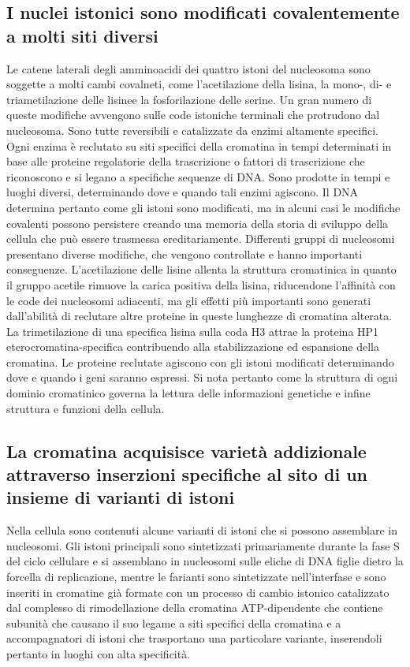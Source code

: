 \subsection{I nuclei istonici sono modificati covalentemente a molti siti diversi}
Le catene laterali degli amminoacidi dei quattro istoni del nucleosoma sono soggette a molti cambi covalneti, come l'acetilazione della lisina, la mono-, di- e triametilazione delle 
lisinee la fosforilazione delle serine. Un gran numero di queste modifiche avvengono sulle code istoniche  terminali che protrudono dal nucleosoma. Sono tutte reversibili e 
catalizzate da enzimi altamente specifici. Ogni enzima \`e reclutato su siti specifici della cromatina in tempi determinati in base alle proteine regolatorie della trascrizione o 
fattori di trascrizione che riconoscono e si legano a specifiche sequenze di DNA. Sono prodotte in tempi e luoghi diversi, determinando dove e quando tali enzimi agiscono. Il DNA 
determina pertanto come gli istoni sono modificati, ma in alcuni casi le modifiche covalenti possono persistere creando una memoria della storia di sviluppo della cellula che pu\`o 
essere trasmessa ereditariamente. Differenti gruppi di nucleosomi presentano diverse modifiche, che vengono controllate e hanno importanti conseguenze. L'acetilazione delle lisine 
allenta la struttura cromatinica in quanto il gruppo acetile rimuove la carica positiva della lisina, riducendone l'affinit\`a con le code dei nucleosomi adiacenti, ma gli effetti pi\`u 
importanti sono generati dall'abilit\`a di reclutare altre proteine in queste lunghezze di cromatina alterata. La trimetilazione di una specifica lisina sulla coda H3 attrae la proteina
HP1 eterocromatina-specifica contribuendo alla stabilizzazione ed espansione della cromatina. Le proteine reclutate agiscono con gli istoni modificati determinando dove e quando i geni
saranno espressi. Si nota pertanto come la struttura di ogni dominio cromatinico governa la lettura delle informazioni genetiche e infine struttura e funzioni della cellula.
\subsection{La cromatina acquisisce variet\`a addizionale attraverso inserzioni specifiche al sito di un insieme di varianti di istoni}
Nella cellula sono contenuti alcune varianti di istoni che si possono assemblare in nucleosomi. Gli istoni principali sono sintetizzati primariamente durante la fase S del ciclo 
cellulare e si assemblano in nucleosomi sulle eliche di DNA figlie dietro la forcella di replicazione, mentre le farianti sono sintetizzate nell'interfase e sono inseriti in cromatine
gi\`a formate con un processo di cambio istonico catalizzato dal complesso di rimodellazione della cromatina ATP-dipendente che contiene subunit\`a che causano il suo legame a siti 
specifici della cromatina e a accompagnatori di istoni che trasportano una particolare variante, inserendoli pertanto in luoghi con alta specificit\`a.
